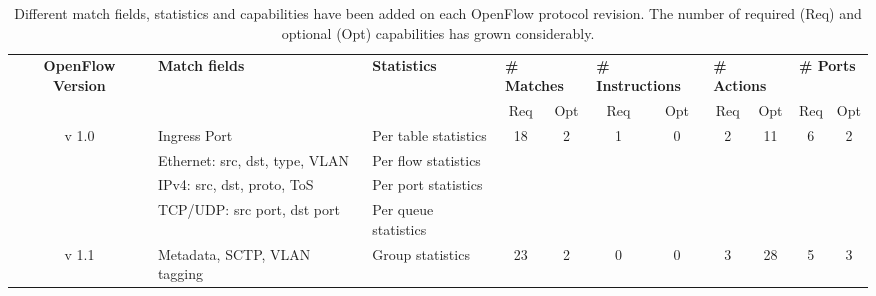 {\renewcommand{\arraystretch}{1.4}
\begin{table}[ht!]
\caption{Different match fields, statistics and capabilities have been added on each OpenFlow protocol revision. The number of required (Req) and optional (Opt) capabilities has grown considerably.}
\label{tab:of-versions}
\begin{center}
\footnotesize
\begin{tabular}{|c|l|l|c|c|c|c|c|c|c|c|}
\hline
\multirow{2}{*}{\textbf{OpenFlow Version}}        & \multirow{2}{*}{\textbf{Match fields}}           & \multirow{2}{*}{\textbf{Statistics}} & \multicolumn{2}{l|}{\textbf{\# Matches}}           & \multicolumn{2}{l|}{\textbf{\# Instructions}}    & \multicolumn{2}{l|}{\textbf{\# Actions}}          & \multicolumn{2}{l|}{\textbf{\# Ports}}           \\ \cline{4-11} 
                         &                                         &                             & Req                 & Opt                 & Req                & Opt                & Req                & Opt                 & Req                & Opt                \\ \hline  \hline
\multirow{4}{*}{v 1.0} & Ingress Port                            & Per table statistics        & \multirow{4}{*}{18} & \multirow{4}{*}{2}  & \multirow{4}{*}{1} & \multirow{4}{*}{0} & \multirow{4}{*}{2} & \multirow{4}{*}{11} & \multirow{4}{*}{6} & \multirow{4}{*}{2} \\ \cline{2-3}
                         & Ethernet: src, dst, type, VLAN                & Per flow statistics         &                     &                     &                    &                    &                    &                     &                    &                    \\ \cline{2-3}
                         & IPv4: src, dst, proto, ToS              & Per port statistics         &                     &                     &                    &                    &                    &                     &                    &                    \\ \cline{2-3}
                         & TCP/UDP: src port, dst port             & Per queue statistics        &                     &                     &                    &                    &                    &                     &                    &                    \\ \hline
\multirow{2}{*}{v 1.1} & Metadata, SCTP,  VLAN tagging       & Group statistics            & \multirow{2}{*}{23} & \multirow{2}{*}{2}  & \multirow{2}{*}{0} & \multirow{2}{*}{0} & \multirow{2}{*}{3} & \multirow{2}{*}{28} & \multirow{2}{*}{5} & \multirow{2}{*}{3} \\ \cline{2-3}

\end{tabular}
\end{center}
\end{table}}
